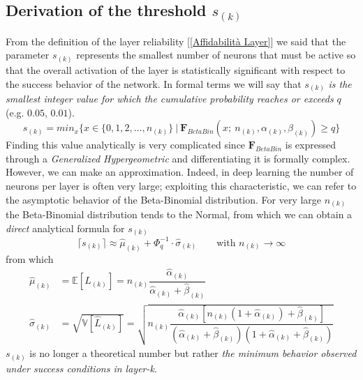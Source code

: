 \documentclass[10pt]{article} %
\begin{document}
\subsection{Derivation of the threshold $s_{(k)}$}
From the definition of the layer reliability [\ref{Affidabilità Layer}] we said that the parameter $s_{(k)}$ represents the smallest number of neurons that must be active so that the overall activation of the layer is statistically significant with respect to the success behavior of the network. In formal terms we will say that $s_{(k)}$ \textit{is the smallest integer value for which the cumulative probability reaches or exceeds} $q$ (e.g. $0.05$, $0.01$).
\begin{equation}
    s_{(k)} = min_{x}\{ x\in \{0,1, 2, \dots, n_{(k)}\}\ |\ \mathbf{F}_{BetaBin}(x;\ n_{(k)},\alpha_{(k)}, \beta_{(k)})\ge q\}
\end{equation}
Finding this value analytically is very complicated since $\mathbf{F}_{BetaBin}$ is expressed through a \textit{Generalized Hypergeometric} and differentiating it is formally complex. However, we can make an approximation. Indeed, in deep learning the number of neurons per layer is often very large; exploiting this characteristic, we can refer to the asymptotic behavior of the Beta-Binomial distribution. For very large $n_{(k)}$ the Beta-Binomial distribution tends to the Normal, from which we can obtain a \textit{direct} analytical formula for $s_{(k)}$
\begin{equation}\label{soglia sk}
    \lceil s_{(k)}\rceil \approx \hat{\mu}_{(k)} + \Phi^{-1}_q\cdot\hat{\sigma}_{(k)} \qquad \text{with } n_{(k)}\rightarrow \infty
\end{equation}
from which
\begin{align}
    \hat{\mu}_{(k)} &= \mathbb{E}[\hat{L}_{(k)}] = n_{(k)}\dfrac{\hat{\alpha}_{(k)}}{\hat{\alpha}_{(k)}+\hat{\beta}_{(k)}}\\
    \hat{\sigma}_{(k)} &= \sqrt{\mathbb{V}[\hat{L}_{(k)}]} = \sqrt{n_{(k)}\dfrac{\hat{\alpha}_{(k)}[n_{(k)}(1+\hat{\alpha}_{(k)})+\hat{\beta}_{(k)}]}{(\hat{\alpha}_{(k)}+\hat{\beta}_{(k)})(1+\hat{\alpha}_{(k)}+\hat{\beta}_{(k)})}}
\end{align}
$s_{(k)}$ is no longer a theoretical number but rather \textit{the minimum behavior observed under success conditions in layer-k}.
\end{document}
